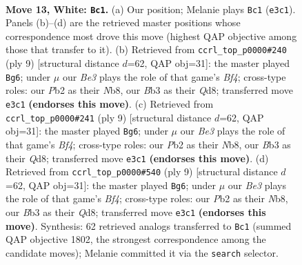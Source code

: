 \documentclass[11pt]{article}
\begin{document}
\clearpage

\begin{figure}[p]\centering
\begin{subfigure}{0.46\textwidth}\centering
\resizebox{\linewidth}{!}{%
\newchessgame
\chessboard[
  setfen={rnbqr1k1/pp3pbp/1n1p2p1/8/3P4/1B2B3/PP3PPP/RN1QNRK1 w - - 1 13},
  showmover=false,
  pgfstyle=straightmove, color=movearrow, markmove={e3-c1}
]}
\caption{}
\end{subfigure}\hfill
\begin{subfigure}{0.46\textwidth}\centering
\resizebox{\linewidth}{!}{%
\newchessgame
\chessboard[
  setfen={rn1qkbnr/pp2pppp/2p5/5b2/3P4/6N1/PPP2PPP/R1BQKBNR b KQkq - 2 5},
  showmover=false,
  pgfstyle=straightmove, color=movearrow, markmove={f5-g6}
]}
\caption{}
\end{subfigure}
\\[4pt]
\begin{subfigure}{0.46\textwidth}\centering
\resizebox{\linewidth}{!}{%
\newchessgame
\chessboard[
  setfen={rn1qkbnr/pp2pppp/2p5/5b2/3P4/6N1/PPP2PPP/R1BQKBNR b KQkq - 2 5},
  showmover=false,
  pgfstyle=straightmove, color=movearrow, markmove={f5-g6}
]}
\caption{}
\end{subfigure}\hfill
\begin{subfigure}{0.46\textwidth}\centering
\resizebox{\linewidth}{!}{%
\newchessgame
\chessboard[
  setfen={rn1qkbnr/pp2pppp/2p5/5b2/3P4/6N1/PPP2PPP/R1BQKBNR b KQkq - 2 5},
  showmover=false,
  pgfstyle=straightmove, color=movearrow, markmove={f5-g6}
]}
\caption{}
\end{subfigure}
\caption{\textbf{Move 13, White: \texttt{Bc1}.} (a) Our position; Melanie plays \texttt{Bc1} (\texttt{e3c1}). Panels (b)--(d) are the retrieved master positions whose correspondence most drove this move (highest QAP objective among those that transfer to it). (b) Retrieved from \texttt{ccrl\_top\_p0000\#240} (ply 9) [structural distance $d$=62, QAP obj=31]: the master played \texttt{Bg6}; under $\mu$ our \emph{Be3} plays the role of that game's \emph{Bf4}; cross-type roles: our \emph{P}b2 as their \emph{N}b8, our \emph{B}b3 as their \emph{Q}d8; transferred move \texttt{e3c1} \textbf{(endorses this move)}. (c) Retrieved from \texttt{ccrl\_top\_p0000\#241} (ply 9) [structural distance $d$=62, QAP obj=31]: the master played \texttt{Bg6}; under $\mu$ our \emph{Be3} plays the role of that game's \emph{Bf4}; cross-type roles: our \emph{P}b2 as their \emph{N}b8, our \emph{B}b3 as their \emph{Q}d8; transferred move \texttt{e3c1} \textbf{(endorses this move)}. (d) Retrieved from \texttt{ccrl\_top\_p0000\#540} (ply 9) [structural distance $d$=62, QAP obj=31]: the master played \texttt{Bg6}; under $\mu$ our \emph{Be3} plays the role of that game's \emph{Bf4}; cross-type roles: our \emph{P}b2 as their \emph{N}b8, our \emph{B}b3 as their \emph{Q}d8; transferred move \texttt{e3c1} \textbf{(endorses this move)}. Synthesis: 62 retrieved analogs transferred to \texttt{Bc1} (summed QAP objective 1802, the strongest correspondence among the candidate moves); Melanie committed it via the \texttt{search} selector.}
\label{fig:thought-m24}
\end{figure}
\end{document}
